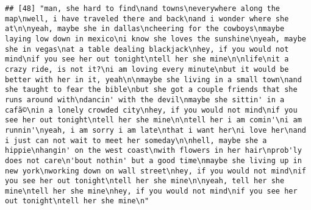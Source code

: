 \documentclass[]{article}
\begin{document}
\begin{verbatim}
## [48] "man, she hard to find\nand towns\neverywhere along the map\nwell, i have traveled there and back\nand i wonder where she at\n\nyeah, maybe she in dallas\ncheering for the cowboys\nmaybe laying low down in mexico\ni know she loves the sunshine\nyeah, maybe she in vegas\nat a table dealing blackjack\nhey, if you would not mind\nif you see her out tonight\ntell her she mine\n\nlife\nit a crazy ride, is not it?\ni am loving every minute\nbut it would be better with her in it, yeah\n\nmaybe she living in a small town\nand she taught to fear the bible\nbut she got a couple friends that she runs around with\ndancin' with the devil\nmaybe she sittin' in a cafã©\nin a lonely crowded city\nhey, if you would not mind\nif you see her out tonight\ntell her she mine\n\ntell her i am comin'\ni am runnin'\nyeah, i am sorry i am late\nthat i want her\ni love her\nand i just can not wait to meet her someday\n\nhell, maybe she a hippie\nhangin' on the west coast\nwith flowers in her hair\nprob'ly does not care\n'bout nothin' but a good time\nmaybe she living up in new york\nworking down on wall street\nhey, if you would not mind\nif you see her out tonight\ntell her she mine\n\nyeah, tell her she mine\ntell her she mine\nhey, if you would not mind\nif you see her out tonight\ntell her she mine\n"                                                                                                                                                                                                                                                                                                                                                                                                                                                                                                                                                                                                                                                                                                                                                                                                                                                                                                                                                                                                                                                                                                                                                                                                                                                                                                                                                                                                                                                                                                                                                                                                                                

\end{verbatim}
\end{document}
